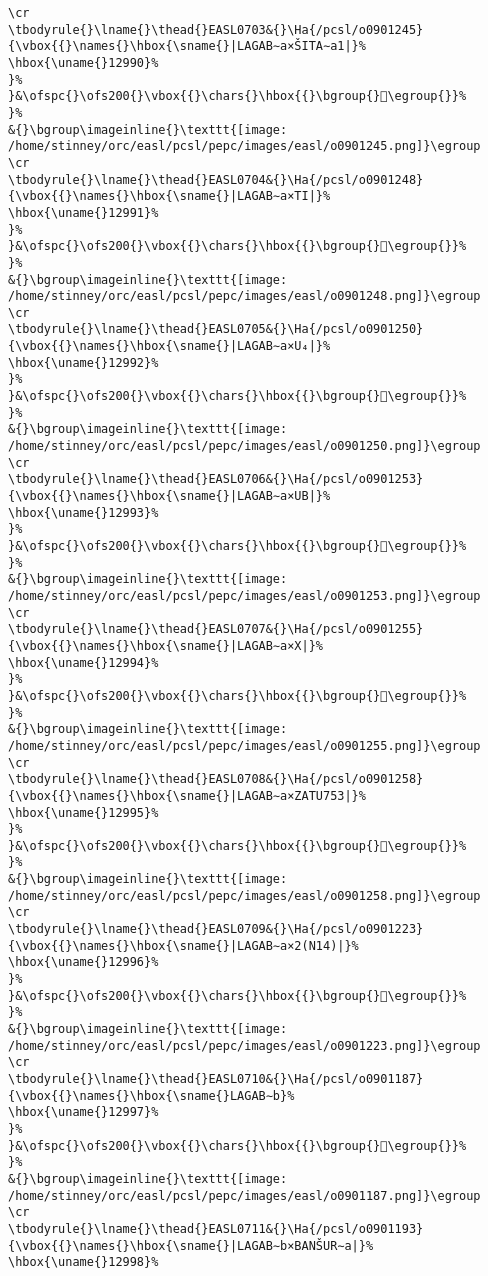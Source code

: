 \begin{verbatim}
\cr
\tbodyrule{}\lname{}\thead{}EASL0703&{}\Ha{/pcsl/o0901245}{\vbox{{}\names{}\hbox{\sname{}|LAGAB∼a×ŠITA∼a1|}%
\hbox{\uname{}12990}%
}%
}&\ofspc{}\ofs200{}\vbox{{}\chars{}\hbox{{}\bgroup{}𒦐\egroup{}}%
}%
&{}\bgroup\imageinline{}\texttt{[image: /home/stinney/orc/easl/pcsl/pepc/images/easl/o0901245.png]}\egroup
\cr
\tbodyrule{}\lname{}\thead{}EASL0704&{}\Ha{/pcsl/o0901248}{\vbox{{}\names{}\hbox{\sname{}|LAGAB∼a×TI|}%
\hbox{\uname{}12991}%
}%
}&\ofspc{}\ofs200{}\vbox{{}\chars{}\hbox{{}\bgroup{}𒦑\egroup{}}%
}%
&{}\bgroup\imageinline{}\texttt{[image: /home/stinney/orc/easl/pcsl/pepc/images/easl/o0901248.png]}\egroup
\cr
\tbodyrule{}\lname{}\thead{}EASL0705&{}\Ha{/pcsl/o0901250}{\vbox{{}\names{}\hbox{\sname{}|LAGAB∼a×U₄|}%
\hbox{\uname{}12992}%
}%
}&\ofspc{}\ofs200{}\vbox{{}\chars{}\hbox{{}\bgroup{}𒦒\egroup{}}%
}%
&{}\bgroup\imageinline{}\texttt{[image: /home/stinney/orc/easl/pcsl/pepc/images/easl/o0901250.png]}\egroup
\cr
\tbodyrule{}\lname{}\thead{}EASL0706&{}\Ha{/pcsl/o0901253}{\vbox{{}\names{}\hbox{\sname{}|LAGAB∼a×UB|}%
\hbox{\uname{}12993}%
}%
}&\ofspc{}\ofs200{}\vbox{{}\chars{}\hbox{{}\bgroup{}𒦓\egroup{}}%
}%
&{}\bgroup\imageinline{}\texttt{[image: /home/stinney/orc/easl/pcsl/pepc/images/easl/o0901253.png]}\egroup
\cr
\tbodyrule{}\lname{}\thead{}EASL0707&{}\Ha{/pcsl/o0901255}{\vbox{{}\names{}\hbox{\sname{}|LAGAB∼a×X|}%
\hbox{\uname{}12994}%
}%
}&\ofspc{}\ofs200{}\vbox{{}\chars{}\hbox{{}\bgroup{}𒦔\egroup{}}%
}%
&{}\bgroup\imageinline{}\texttt{[image: /home/stinney/orc/easl/pcsl/pepc/images/easl/o0901255.png]}\egroup
\cr
\tbodyrule{}\lname{}\thead{}EASL0708&{}\Ha{/pcsl/o0901258}{\vbox{{}\names{}\hbox{\sname{}|LAGAB∼a×ZATU753|}%
\hbox{\uname{}12995}%
}%
}&\ofspc{}\ofs200{}\vbox{{}\chars{}\hbox{{}\bgroup{}𒦕\egroup{}}%
}%
&{}\bgroup\imageinline{}\texttt{[image: /home/stinney/orc/easl/pcsl/pepc/images/easl/o0901258.png]}\egroup
\cr
\tbodyrule{}\lname{}\thead{}EASL0709&{}\Ha{/pcsl/o0901223}{\vbox{{}\names{}\hbox{\sname{}|LAGAB∼a×2(N14)|}%
\hbox{\uname{}12996}%
}%
}&\ofspc{}\ofs200{}\vbox{{}\chars{}\hbox{{}\bgroup{}𒦖\egroup{}}%
}%
&{}\bgroup\imageinline{}\texttt{[image: /home/stinney/orc/easl/pcsl/pepc/images/easl/o0901223.png]}\egroup
\cr
\tbodyrule{}\lname{}\thead{}EASL0710&{}\Ha{/pcsl/o0901187}{\vbox{{}\names{}\hbox{\sname{}LAGAB∼b}%
\hbox{\uname{}12997}%
}%
}&\ofspc{}\ofs200{}\vbox{{}\chars{}\hbox{{}\bgroup{}𒦗\egroup{}}%
}%
&{}\bgroup\imageinline{}\texttt{[image: /home/stinney/orc/easl/pcsl/pepc/images/easl/o0901187.png]}\egroup
\cr
\tbodyrule{}\lname{}\thead{}EASL0711&{}\Ha{/pcsl/o0901193}{\vbox{{}\names{}\hbox{\sname{}|LAGAB∼b×BANŠUR∼a|}%
\hbox{\uname{}12998}%

\end{verbatim}

